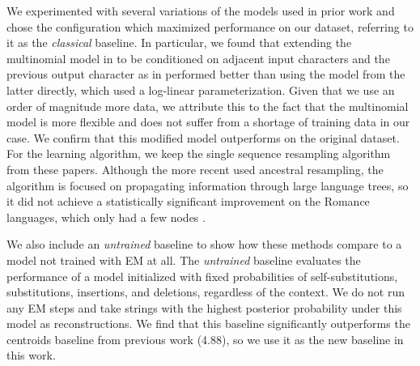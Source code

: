 \documentclass[11pt]{article}
\begin{document}
We experimented with several variations of the models used in prior work \citep{bouchard-etal-2007-probabilistic, NIPS2007_7ce3284b, bouchard-cote-etal-2009-improved} and chose the configuration which maximized performance on our dataset, referring to it as the \textit{classical} baseline. In particular, we found that extending the multinomial model in \citet{bouchard-etal-2007-probabilistic} to be conditioned on adjacent input characters and the previous output character as in \citet{bouchard-cote-etal-2009-improved} performed better than using the model from the latter directly, which used a log-linear parameterization. Given that we use an order of magnitude more data, we attribute this to the fact that the multinomial model is more flexible and does not suffer from a shortage of training data in our case. We confirm that this modified model outperforms \citet{bouchard-etal-2007-probabilistic, NIPS2007_7ce3284b} on the original dataset. For the learning algorithm, we keep the single sequence resampling algorithm from these papers. Although the more recent \citet{bouchard-cote-etal-2009-improved, doi:10.1073/pnas.1204678110} used ancestral resampling, the algorithm is focused on propagating information through large language trees, so it did not achieve a statistically significant improvement on the Romance languages, which only had a few nodes \citep{bouchard-cote-etal-2009-improved}. 

We also include an \textit{untrained} baseline to show how these methods compare to a model not trained with EM at all. The \textit{untrained} baseline evaluates the performance of a model initialized with fixed probabilities of self-substitutions, substitutions, insertions, and deletions, regardless of the context. We do not run any EM steps and take strings with the highest posterior probability under this model as reconstructions. We find that this baseline significantly outperforms the centroids baseline from previous work (4.88), so we use it as the new baseline in this work. 
\end{document}
